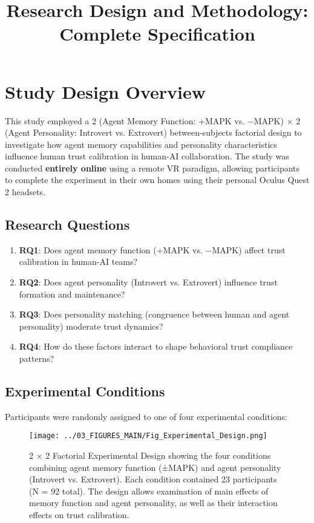 \documentclass[12pt]{article}
\title{\textbf{Research Design and Methodology:\\Complete Specification}}
\date{}
\begin{document}
\maketitle

\section{Study Design Overview}

This study employed a 2 (Agent Memory Function: +MAPK vs. $-$MAPK) $\times$ 2 (Agent Personality: Introvert vs. Extrovert) between-subjects factorial design to investigate how agent memory capabilities and personality characteristics influence human trust calibration in human-AI collaboration. The study was conducted \textbf{entirely online} using a remote VR paradigm, allowing participants to complete the experiment in their own homes using their personal Oculus Quest 2 headsets.

\subsection{Research Questions}

\begin{enumerate}
    \item \textbf{RQ1}: Does agent memory function (+MAPK vs. $-$MAPK) affect trust calibration in human-AI teams?
    \item \textbf{RQ2}: Does agent personality (Introvert vs. Extrovert) influence trust formation and maintenance?
    \item \textbf{RQ3}: Does personality matching (congruence between human and agent personality) moderate trust dynamics?
    \item \textbf{RQ4}: How do these factors interact to shape behavioral trust compliance patterns?
\end{enumerate}

\subsection{Experimental Conditions}

Participants were randomly assigned to one of four experimental conditions:

\begin{figure}[h]
\centering
\texttt{[image: ../03\_FIGURES\_MAIN/Fig\_Experimental\_Design.png]}
\caption{2 × 2 Factorial Experimental Design showing the four conditions combining agent memory function (±MAPK) and agent personality (Introvert vs. Extrovert). Each condition contained 23 participants (N = 92 total). The design allows examination of main effects of memory function and agent personality, as well as their interaction effects on trust calibration.}
\label{fig:experimental_design}
\end{figure}
\end{document}
